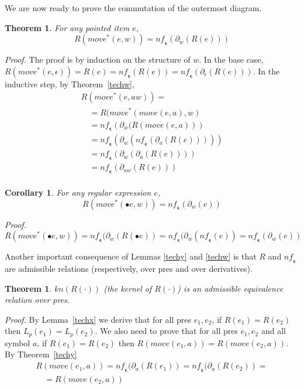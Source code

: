 \documentclass[preprint]{sigplanconf}
\newcommand{\der}[2]{\ensuremath{\partial_{#1}(#2)}}
\newcommand{\nf}{\mathit{nf}_{\!\mathbf{\epsilon}}}
\newcounter{item}
\newtheorem{theorem}[item]{Theorem}
\newtheorem{corollary}[item]{Corollary}
\newenvironment{proof}{\begin{trivlist}\item[]{\em Proof.}}{\end{trivlist}}
\begin{document}
We are now ready to prove the commutation of the outermost diagram.

\begin{theorem}For any pointed item $e$,
  \[R(move^*(e,w)) = \nf(\der{w}{R(e)})\]
\end{theorem}
\begin{proof}
The proof is by induction on the structure of $w$.
In the base case, $R(move^*(e,\epsilon)) = R(e) = \nf(R(e)) =
\nf(\der{\epsilon}{R(e)})$. In the inductive step, by Theorem~\ref{techw},
$$\begin{array}{l}
R(move^*(e,aw)) =\\
\quad = R(move^*(move(e,a),w)\\
\quad = \nf(\der{w}{R(move(e,a)})\\
\quad = \nf(\der{w}{\nf(\der{a}{R(e)})})\\
\quad = \nf(\der{w}{\der{a}{R(e)}})\\
\quad = \nf(\der{aw}{R(e)})\\
\end{array}
$$
\end{proof}
\begin{corollary}\label{corollary1}
For any regular expression $e$,
$$ R(move^*(\bullet e,w)) = \nf(\der{w}{e})$$
\end{corollary}
\begin{proof}
$$
\!
R(move^*(\bullet e,w))
\!=\! \nf(\der{w}{R(\bullet e)}
\!=\! \nf(\der{w}{\nf(e)}
\!=\! \nf(\der{w}{e})
$$
\end{proof}

Another important consequence of Lemmas \ref{techy} and \ref{techw}
is that $R$ and $\nf$ are admissible relations (respectively, over
pres and over derivatives).

\begin{theorem}\label{admissible1}
$kn(R(\cdot))$ (the kernel of $R(\cdot)$) is an admissible
equivalence relation over pres.
\end{theorem}
\begin{proof}
By Lemma~\ref{techx} we derive that for all pres $e_1,e_2$,
if $R(e_1) = R(e_2)$ then $L_p(e_1) = L_p(e_2)$.
We also need to prove that for all pres $e_1,e_2$ and all symbol $a$,
if $R(e_1) = R(e_2)$ then
$R(move(e_1,a)) = R(move(e_2,a))$. By Theorem~\ref{techy}
$$\begin{array}{l}
R(move(e_1,a)) =
\nf(\der{a}{R(e_1)}
= \nf(\der{a}{R(e_2)} =\\
\quad = R(move(e_2,a))
\end{array}
$$
\end{proof}
\end{document}
